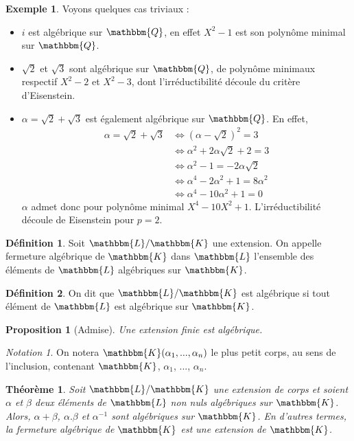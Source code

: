 \documentclass[12pt]{article}
\newcommand{\jL}{\mathbbm{L}}
\newcommand{\Q}{\mathbbm{Q}}
\newcommand{\K}{\mathbbm{K}}
\newtheorem{prop}{Proposition}
\newtheorem{thm}{Théorème}
\theoremstyle{definition}\newtheorem{defn}{Définition}
\theoremstyle{definition}\newtheorem{exm}{Exemple}
\theoremstyle{definition}\newtheorem{rem}{Remarque}
\theoremstyle{definition}\newtheorem{algo}{Algorithme}
\theoremstyle{remark}\newtheorem{exo}{Exercice}
\theoremstyle{remark}\newtheorem{nota}{Notation}
\begin{document}
\begin{exm}
Voyons quelques cas triviaux :
	\begin{itemize}
		\item $i$ est algébrique sur $\Q$, en effet $X^2-1$ est son polynôme minimal sur $\Q$.
		\item $\sqrt2$ et $\sqrt3$ sont algébrique sur $\Q$, de polynôme minimaux respectif $X^2 -2$ et $X^2-3$, dont l'irréductibilité découle du critère d'Eisenstein.
		\item $\alpha = \sqrt2 + \sqrt3$ est également algébrique sur $\Q$. En effet,
\begin{align*}
 \alpha = \sqrt2 + \sqrt3 &\Leftrightarrow (\alpha-\sqrt2)^2= 3\\ &\Leftrightarrow \alpha^2 + 2\alpha\sqrt2 + 2 = 3\\ &\Leftrightarrow \alpha^2 - 1 =  -2\alpha\sqrt2\\ &\Leftrightarrow \alpha^4 - 2\alpha^2 +1 =  8\alpha^2\\ &\Leftrightarrow \alpha^4 - 10\alpha^2 +1 = 0
\end{align*}		
$\alpha$ admet donc pour polynôme minimal $X^4 -10X^2 +1$. L'irréductibilité découle de Eisenstein pour $p=2$.	
	\end{itemize}
\end{exm}

\begin{defn}
Soit $\jL / \K$ une extension. On appelle fermeture algébrique de $\K$ dans $\jL$ l'ensemble des éléments de $\jL$ algébriques sur $\K$.
\end{defn}

\begin{defn}
On dit que $\jL / \K$ est algébrique si tout élément de $\jL$ est algébrique sur $\K$.
\end{defn}

\begin{prop}[Admise]
Une extension finie est algébrique.
\end{prop}

\begin{nota}
On notera $\K(\alpha_1, ..., \alpha_n)$ le plus petit corps, au sens de l'inclusion, contenant $\K$, $\alpha_1$, ..., $\alpha_n$.
\end{nota}

\begin{thm}
Soit $\jL/\K$ une extension de corps et soient $\alpha$ et $\beta$ deux éléments de $\jL$ non nuls algébriques sur $\K$. Alors, $\alpha + \beta$, $\alpha.\beta$ et $\alpha^{-1}$ sont algébriques sur $\K$. En d'autres termes, la fermeture algébrique de $\K$ est une extension de $\K$.
\end{thm}
\end{document}
